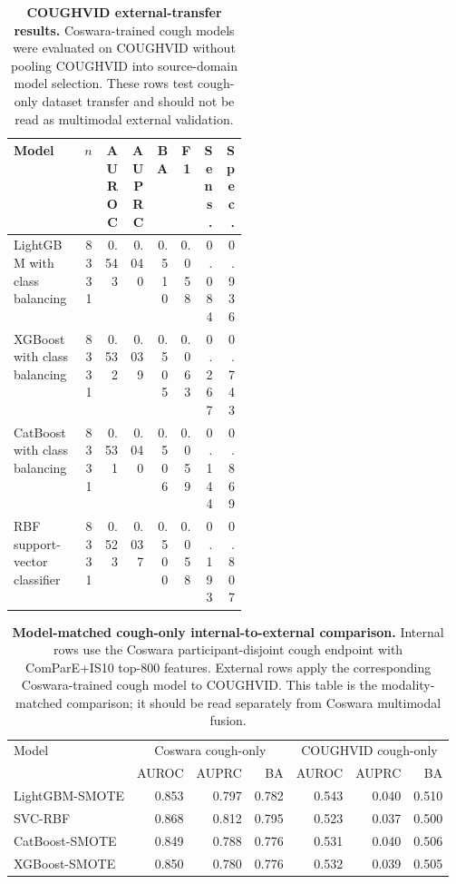 \documentclass[11pt]{article}
\begin{document}
\begin{table}[t]
\centering
\caption{\textbf{COUGHVID external-transfer results.} Coswara-trained cough models were evaluated on COUGHVID without pooling COUGHVID into source-domain model selection. These rows test cough-only dataset transfer and should not be read as multimodal external validation.}
\label{tab:coughvid_transfer}
\scriptsize
\setlength{\tabcolsep}{2pt}
\begin{tabularx}{\linewidth}{L{0.30\linewidth} r r r r r r r}
\toprule
Model & $n$ & AUROC & AUPRC & BA & F1 & Sens. & Spec. \\
\midrule
LightGBM with class balancing & 8331 & 0.543 & 0.040 & 0.510 & 0.058 & 0.084 & 0.936 \\
XGBoost with class balancing & 8331 & 0.532 & 0.039 & 0.505 & 0.063 & 0.267 & 0.743 \\
CatBoost with class balancing & 8331 & 0.531 & 0.040 & 0.506 & 0.059 & 0.144 & 0.869 \\
RBF support-vector classifier & 8331 & 0.523 & 0.037 & 0.500 & 0.058 & 0.193 & 0.807 \\
\bottomrule
\end{tabularx}
\end{table}

\begin{table}[t]
\centering
\caption{\textbf{Model-matched cough-only internal-to-external comparison.} Internal rows use the Coswara participant-disjoint cough endpoint with ComParE+IS10 top-800 features. External rows apply the corresponding Coswara-trained cough model to COUGHVID. This table is the modality-matched comparison; it should be read separately from Coswara multimodal fusion.}
\label{tab:cough_internal_external}
\begin{tabular}{lrrrrrr}
\toprule
Model & \multicolumn{3}{c}{Coswara cough-only} & \multicolumn{3}{c}{COUGHVID cough-only} \\
\cmidrule(lr){2-4}\cmidrule(lr){5-7}
 & AUROC & AUPRC & BA & AUROC & AUPRC & BA \\
\midrule
LightGBM-SMOTE & 0.853 & 0.797 & 0.782 & 0.543 & 0.040 & 0.510 \\
SVC-RBF & 0.868 & 0.812 & 0.795 & 0.523 & 0.037 & 0.500 \\
CatBoost-SMOTE & 0.849 & 0.788 & 0.776 & 0.531 & 0.040 & 0.506 \\
XGBoost-SMOTE & 0.850 & 0.780 & 0.776 & 0.532 & 0.039 & 0.505 \\
\bottomrule
\end{tabular}
\end{table}
\end{document}
